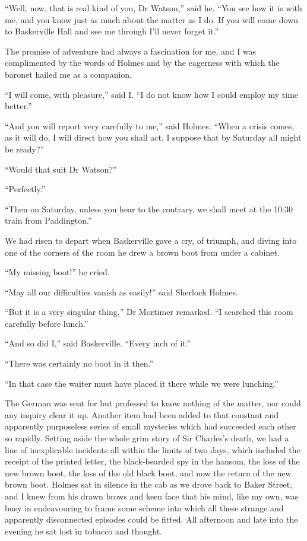 \documentclass[paper=a5,BCOR=7mm,twoside,DIV=calc,12pt,usegeometry,openany,chapterprefix,endperiod,headings=big]{scrbook} %
\begin{document}
\enquote{Well, now, that is real kind of you, Dr Watson,} said he. \enquote{You see how it is with me, and you know just as much about the matter as I do. If you will come down to Baskerville Hall and see me through I'll never forget it.}

The promise of adventure had always a fascination for me, and I was complimented by the words of Holmes and by the eagerness with which the baronet hailed me as a companion.

\enquote{I will come, with pleasure,} said I. \enquote{I do not know how I could employ my time better.}

\enquote{And you will report very carefully to me,} said Holmes. \enquote{When a crisis comes, as it will do, I will direct how you shall act. I suppose that by Saturday all might be ready?}

\enquote{Would that suit Dr Watson?}

\enquote{Perfectly.}

\enquote{Then on Saturday, unless you hear to the contrary, we shall meet at the 10:30 train from Paddington.}

We had risen to depart when Baskerville gave a cry, of triumph, and diving into one of the corners of the room he drew a brown boot from under a cabinet.

\enquote{My missing boot!} he cried.

\enquote{May all our difficulties vanish as easily!} said Sherlock Holmes.

\enquote{But it is a very singular thing,} Dr Mortimer remarked. \enquote{I searched this room carefully before lunch.}

\enquote{And so did I,} said Baskerville. \enquote{Every inch of it.}

\enquote{There was certainly no boot in it then.}

\enquote{In that case the waiter must have placed it there while we were lunching.}

The German was sent for but professed to know nothing of the matter, nor could any inquiry clear it up. Another item had been added to that constant and apparently purposeless series of small mysteries which had succeeded each other so rapidly. Setting aside the whole grim story of Sir Charles's death, we had a line of inexplicable incidents all within the limits of two days, which included the receipt of the printed letter, the black-bearded spy in the hansom, the loss of the new brown boot, the loss of the old black boot, and now the return of the new brown boot. Holmes sat in silence in the cab as we drove back to Baker Street, and I knew from his drawn brows and keen face that his mind, like my own, was busy in endeavouring to frame some scheme into which all these strange and apparently disconnected episodes could be fitted. All afternoon and late into the evening he sat lost in tobacco and thought.
\end{document}
